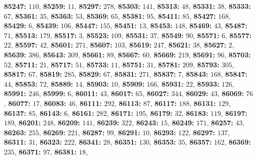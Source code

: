 \textsf{\bfseries 85247:} $110$, \textsf{\bfseries 85259:} $11$, \textsf{\bfseries 85297:} $278$, \textsf{\bfseries 85303:} $141$, \textsf{\bfseries 85313:} $48$, \textsf{\bfseries 85331:} $38$, \textsf{\bfseries 85333:} $67$, \textsf{\bfseries 85361:} $35$, \textsf{\bfseries 85363:} $53$, \textsf{\bfseries 85369:} $65$, \textsf{\bfseries 85381:} $95$, \textsf{\bfseries 85411:} $85$, \textsf{\bfseries 85427:} $168$, \textsf{\bfseries 85429:} $6$, \textsf{\bfseries 85439:} $106$, \textsf{\bfseries 85447:} $155$, \textsf{\bfseries 85451:} $13$, \textsf{\bfseries 85453:} $148$, \textsf{\bfseries 85469:} $43$, \textsf{\bfseries 85487:} $71$, \textsf{\bfseries 85513:} $179$, \textsf{\bfseries 85517:} $3$, \textsf{\bfseries 85523:} $109$, \textsf{\bfseries 85531:} $37$, \textsf{\bfseries 85549:} $90$, \textsf{\bfseries 85571:} $6$, \textsf{\bfseries 85577:} $22$, \textsf{\bfseries 85597:} $42$, \textsf{\bfseries 85601:} $271$, \textsf{\bfseries 85607:} $103$, \textsf{\bfseries 85619:} $247$, \textsf{\bfseries 85621:} $38$, \textsf{\bfseries 85627:} $2$, \textsf{\bfseries 85639:} $386$, \textsf{\bfseries 85643:} $309$, \textsf{\bfseries 85661:} $89$, \textsf{\bfseries 85667:} $60$, \textsf{\bfseries 85669:} $219$, \textsf{\bfseries 85691:} $96$, \textsf{\bfseries 85703:} $52$, \textsf{\bfseries 85711:} $21$, \textsf{\bfseries 85717:} $51$, \textsf{\bfseries 85733:} $11$, \textsf{\bfseries 85751:} $31$, \textsf{\bfseries 85781:} $209$, \textsf{\bfseries 85793:} $305$, \textsf{\bfseries 85817:} $67$, \textsf{\bfseries 85819:} $285$, \textsf{\bfseries 85829:} $67$, \textsf{\bfseries 85831:} $271$, \textsf{\bfseries 85837:} $7$, \textsf{\bfseries 85843:} $168$, \textsf{\bfseries 85847:} $44$, \textsf{\bfseries 85853:} $72$, \textsf{\bfseries 85889:} $14$, \textsf{\bfseries 85903:} $10$, \textsf{\bfseries 85909:} $166$, \textsf{\bfseries 85931:} $22$, \textsf{\bfseries 85933:} $126$, \textsf{\bfseries 85991:} $246$, \textsf{\bfseries 85999:} $6$, \textsf{\bfseries 86011:} $43$, \textsf{\bfseries 86017:} $65$, \textsf{\bfseries 86027:} $344$, \textsf{\bfseries 86029:} $43$, \textsf{\bfseries 86069:} $76$, \textsf{\bfseries 86077:} $17$, \textsf{\bfseries 86083:} $46$, \textsf{\bfseries 86111:} $292$, \textsf{\bfseries 86113:} $87$, \textsf{\bfseries 86117:} $188$, \textsf{\bfseries 86131:} $129$, \textsf{\bfseries 86137:} $85$, \textsf{\bfseries 86143:} $6$, \textsf{\bfseries 86161:} $282$, \textsf{\bfseries 86171:} $195$, \textsf{\bfseries 86179:} $32$, \textsf{\bfseries 86183:} $119$, \textsf{\bfseries 86197:} $189$, \textsf{\bfseries 86201:} $248$, \textsf{\bfseries 86209:} $141$, \textsf{\bfseries 86239:} $322$, \textsf{\bfseries 86243:} $15$, \textsf{\bfseries 86249:} $171$, \textsf{\bfseries 86257:} $43$, \textsf{\bfseries 86263:} $255$, \textsf{\bfseries 86269:} $221$, \textsf{\bfseries 86287:} $99$, \textsf{\bfseries 86291:} $10$, \textsf{\bfseries 86293:} $122$, \textsf{\bfseries 86297:} $137$, \textsf{\bfseries 86311:} $31$, \textsf{\bfseries 86323:} $222$, \textsf{\bfseries 86341:} $28$, \textsf{\bfseries 86351:} $130$, \textsf{\bfseries 86353:} $35$, \textsf{\bfseries 86357:} $162$, \textsf{\bfseries 86369:} $235$, \textsf{\bfseries 86371:} $97$, \textsf{\bfseries 86381:} $18$, 
